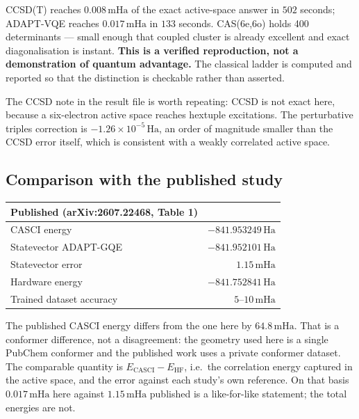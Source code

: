 \documentclass[11pt,a4paper]{article}
\newcommand{\mHa}{\ensuremath{\,\mathrm{mHa}}}
\newcommand{\Ha}{\ensuremath{\,\mathrm{Ha}}}
\begin{document}
\begin{caution}
CCSD(T) reaches $0.008\mHa$ of the exact active-space answer in $502$ seconds;
ADAPT-VQE reaches $0.017\mHa$ in $133$ seconds. CAS(6e,6o) holds 400
determinants --- small enough that coupled cluster is already excellent and
exact diagonalisation is instant. \textbf{This is a verified reproduction, not a
demonstration of quantum advantage.} The classical ladder is computed and
reported so that the distinction is checkable rather than asserted.
\end{caution}

The CCSD note in the result file is worth repeating: CCSD is not exact here,
because a six-electron active space reaches hextuple excitations. The
perturbative triples correction is $-1.26\times10^{-5}\Ha$, an order of
magnitude smaller than the CCSD error itself, which is consistent with a
weakly correlated active space.

\subsection{Comparison with the published study}

\begin{center}
\small
\begin{tabular}{lr}
\toprule
Published (arXiv:2607.22468, Table 1) & \\
\midrule
CASCI energy                & $-841.953249\Ha$ \\
Statevector ADAPT-GQE       & $-841.952101\Ha$ \\
Statevector error           & $1.15\mHa$ \\
Hardware energy             & $-841.752841\Ha$ \\
Trained dataset accuracy    & $5$--$10\mHa$ \\
\bottomrule
\end{tabular}
\end{center}

\begin{caution}
The published CASCI energy differs from the one here by $64.8\mHa$. That is a
conformer difference, not a disagreement: the geometry used here is a single
PubChem conformer and the published work uses a private conformer dataset. The
comparable quantity is $E_{\mathrm{CASCI}} - E_{\mathrm{HF}}$, i.e.\ the
correlation energy captured in the active space, and the error against each
study's own reference. On that basis $0.017\mHa$ here against $1.15\mHa$
published is a like-for-like statement; the total energies are not.
\end{caution}
\end{document}
